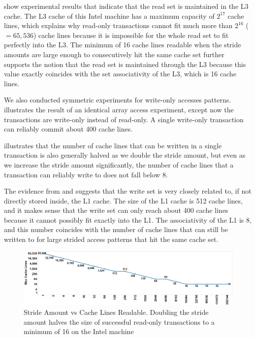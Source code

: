  show experimental results that indicate
that the read set is maintained in the
{L3} cache. The {L3} cache of this Intel machine has a maximum
capacity of $2^{17}$ cache lines, which explains why read-only transactions
cannot fit much more than $2^{16}$ ($=65,536$) cache lines because it is impossible
for the whole read set to fit perfectly into the {L3}. The minimum of 16
cache lines readable when the stride amounts are large enough to consecutively
hit the same cache set further supports the notion that the read set is
maintained through the {L3} because this value exactly coincides with the
set associativity of the {L3}, which is 16 cache lines.

We also conducted symmetric experiments for write-only accesses
patterns.   illustrates 
the result of an
identical array access experiment, except now the 
transactions are write-only
instead of read-only. A single write-only transaction 
can reliably commit about 400 cache lines.

 illustrates that the number of cache
lines that can be written in a single transaction 
is also generally halved as we
double the stride amount, but even as we increase the stride amount
significantly, the number of cache lines that a 
transaction can reliably write
to does not fall below 8.

The evidence from  and
 suggests that the write set is very
closely related to, if not directly stored inside, the {L1} cache. The
size of the {L1} cache is 512 cache lines, and it makes sense that the
write set can only reach about 400 cache lines because it cannot possibly fit
exactly into the {L1}. The associativity of the {L1} is 8, and
this number coincides with the number of cache lines that can still be written
to for large strided access patterns that hit the same cache set.

\begin{figure}[]%
\centering
\includegraphics[width=\linewidth]{images/wttm_stride_read_intel}
\caption{Stride Amount vs Cache Lines Readable. Doubling the stride amount halves the size of successful read-only
transactions to a minimum of 16 on the Intel machine}
\label{fig:wttm_stride_read_intel}
\end{figure}


